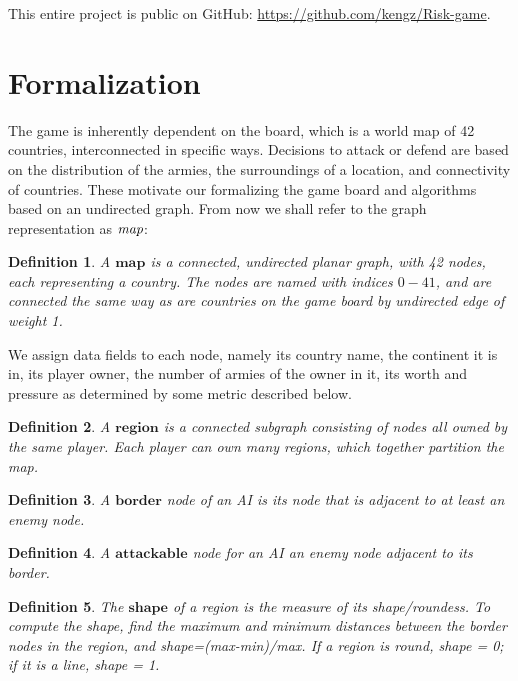 \documentclass[12pt]{article}  %
\newtheorem{definition}{Definition}
\begin{document}
This entire project is public on GitHub: \url{https://github.com/kengz/Risk-game}.



\section{Formalization} \label{formalization}

The game is inherently dependent on the board, which is a world map of 42 countries, interconnected in specific ways. Decisions to attack or defend are based on the distribution of the armies, the surroundings of a location, and connectivity of countries. These motivate our formalizing the game board and algorithms based on an undirected graph. From now we shall refer to the graph representation as $\emph{map}$:

\begin{definition} \label{map}
A $\textbf{map}$ is a connected, undirected planar graph, with 42 nodes, each representing a country. The nodes are named with indices $0-41$, and are connected the same way as are countries on the game board by undirected edge of weight 1.
\end{definition}

We assign data fields to each node, namely its country name, the continent it is in, its player owner, the number of armies of the owner in it, its worth and pressure as determined by some metric described below.


\begin{definition} \label{region}
A $\textbf{region}$ is a connected subgraph consisting of nodes all owned by the same player. Each player can own many regions, which together partition the map.
\end{definition}

\begin{definition} \label{border}
A $\textbf{border}$ node of an AI is its node that is adjacent to at least an enemy node.
\end{definition}

\begin{definition} \label{attackable}
A $\textbf{attackable}$ node for an AI an enemy node adjacent to its border.
\end{definition}

\begin{definition} \label{shape}
The $\textbf{shape}$ of a region is the measure of its shape/roundess. To compute the shape, find the maximum and minimum distances between the border nodes in the region, and shape=(max-min)/max. If a region is round, shape = 0; if it is a line, shape = 1.
\end{definition}
\end{document}
